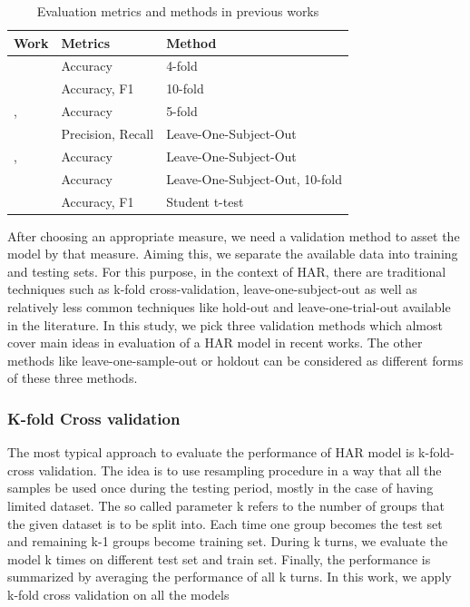 \documentclass[journal,article,submit,moreauthors,pdftex]{Definitions/mdpi}
\begin{document}
\begin{table}[H]
	\caption{Evaluation metrics and methods in previous works }
	\centering
	\begin{tabular}{p{2cm}p{5cm}p{7cm}}
		\toprule
		\textbf{Work} & \textbf{Metrics} & \textbf{Method} \\
		\midrule	
		\cite{brownlee2018gentle}&Accuracy&4-fold\\
		\cite{Nourani_CoMoRea2019}&Accuracy, F1& 10-fold\\
		\cite{shakya2018comparative},\cite{soro2019recognition}&Accuracy&5-fold\\	
		\cite{morris2014recofit}&Precision, Recall& Leave-One-Subject-Out\\
		\cite{zhang2011feature},\cite{mehrang2017human}&Accuracy&Leave-One-Subject-Out \\
		\cite{yurtman2017activity}&Accuracy&Leave-One-Subject-Out, 10-fold\\
		\cite{rosati2018comparison}&Accuracy, F1& Student t-test\\
		\bottomrule
	\end{tabular}
	\label{evaluation_methods}
\end{table}
After choosing an appropriate measure, we need a validation method to asset the model by that measure. Aiming this, we separate the available data into training and testing sets. For this purpose, in the context of HAR, there are traditional techniques such as k-fold cross-validation, leave-one-subject-out as well as relatively less common techniques like hold-out and leave-one-trial-out available in the literature. In this study, we pick three validation methods which almost cover main ideas in evaluation of a HAR model in recent works. The other methods like leave-one-sample-out or holdout can be considered as different forms of these three methods.
\subsubsection{K-fold Cross validation}
The most typical approach to evaluate the performance of HAR model is k-fold-cross validation. The idea is to use resampling procedure in a way that all the samples be used once during the testing period, mostly in the case of having limited dataset. The so called parameter k refers to the number of groups that the given dataset is to be split into. Each time one group becomes the test set and remaining k-1 groups become training set. During k turns, we evaluate the model k times on different test set and train set. Finally, the performance is summarized by averaging the performance of all k turns. In this work, we apply k-fold cross validation on all the models
\end{document}
